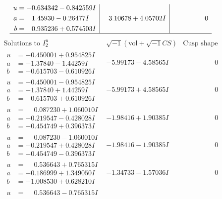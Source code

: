 \documentclass[1p]{elsarticle_modified}
\theoremstyle{definition}
\newcommand{\I}{\sqrt{-1}}
\begin{document}
$$\begin{array}{c|c|c}
\begin{aligned}
u &= -0.634342 - 0.842559 I \\
a &= \phantom{-}1.45930 - 0.26477 I \\
b &= \phantom{-}0.935236 + 0.574503 I\end{aligned}
 & \phantom{-}3.10678 + 4.05702 I & \phantom{-0.000000 } 0\\
 \hline 
 \end{array}$$\newpage$$\begin{array}{c|c|c}  
\text{Solutions to }I^u_{2}& \I (\text{vol} + \sqrt{-1}CS) & \text{Cusp shape}\\
 \hline 
\begin{aligned}
u &= -0.450001 + 0.954825 I \\
a &= -1.37840 - 1.44259 I \\
b &= -0.615703 - 0.610926 I\end{aligned}
 & -5.99173 - 4.58565 I & \phantom{-0.000000 } 0 \\ \hline\begin{aligned}
u &= -0.450001 - 0.954825 I \\
a &= -1.37840 + 1.44259 I \\
b &= -0.615703 + 0.610926 I\end{aligned}
 & -5.99173 + 4.58565 I & \phantom{-0.000000 } 0 \\ \hline\begin{aligned}
u &= \phantom{-}0.087230 + 1.060010 I \\
a &= -0.219547 - 0.428028 I \\
b &= -0.454749 + 0.396373 I\end{aligned}
 & -1.98416 + 1.90385 I & \phantom{-0.000000 } 0 \\ \hline\begin{aligned}
u &= \phantom{-}0.087230 - 1.060010 I \\
a &= -0.219547 + 0.428028 I \\
b &= -0.454749 - 0.396373 I\end{aligned}
 & -1.98416 - 1.90385 I & \phantom{-0.000000 } 0 \\ \hline\begin{aligned}
u &= \phantom{-}0.536643 + 0.765315 I \\
a &= -0.186999 + 1.349050 I \\
b &= -1.008530 + 0.628210 I\end{aligned}
 & -1.34733 - 1.57036 I & \phantom{-0.000000 } 0 \\ \hline\begin{aligned}
u &= \phantom{-}0.536643 - 0.765315 I \\

\end{aligned}
\end{array}$$
\end{document}
